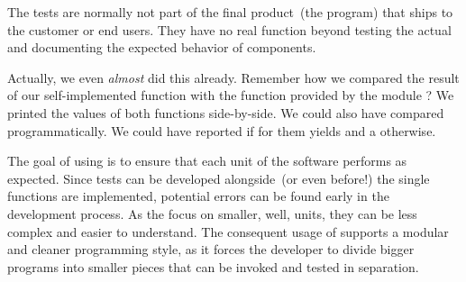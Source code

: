 The tests are normally not part of the final product~(the program) that ships to the customer or end users.
They have no real function beyond testing the actual and documenting the expected behavior of components.

Actually, we even \emph{almost} did this already.
Remember how we compared the result of our self-implemented  function with the  function provided by the module ?
We printed the values of both functions side-by-side.
We could also have compared programmatically.
We could have reported  if  for them yields  and a  otherwise.

The goal of using  is to ensure that each unit of the software performs as expected.
Since tests can be developed alongside~(or even before!) the single functions are implemented, potential errors can be found early in the development process.
As the  focus on smaller, well, units, they can be less complex and easier to understand.
The consequent usage of  supports a modular and cleaner programming style, as it forces the developer to divide bigger programs into smaller pieces that can be invoked and tested in separation.

